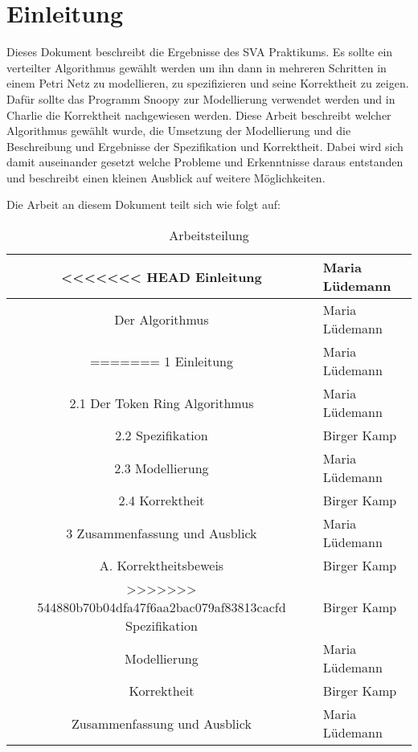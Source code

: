 \newpage
\section{Einleitung} 
Dieses Dokument beschreibt die Ergebnisse des SVA Praktikums. Es sollte ein verteilter Algorithmus gewählt werden um ihn dann in mehreren Schritten in einem Petri Netz zu modellieren, zu spezifizieren und seine Korrektheit zu zeigen. Dafür sollte das Programm Snoopy zur Modellierung verwendet werden und in Charlie die Korrektheit nachgewiesen werden. Diese Arbeit beschreibt welcher Algorithmus gewählt wurde, die Umsetzung der Modellierung und die Beschreibung und Ergebnisse der Spezifikation und Korrektheit.
Dabei wird sich damit auseinander gesetzt welche Probleme und Erkenntnisse daraus entstanden und beschreibt einen kleinen Ausblick auf weitere Möglichkeiten.

Die Arbeit an diesem Dokument teilt sich wie folgt auf:

\begin{table}[H]
\centering
 \begin{tabular}{|c|l|}
 \hline
<<<<<<< HEAD
 	Einleitung & Maria Lüdemann\\
 \hline
	Der Algorithmus & Maria Lüdemann\\
=======
 	1 Einleitung & Maria Lüdemann\\
 \hline
	2.1 Der Token Ring Algorithmus & Maria Lüdemann\\
 \hline
	2.2 Spezifikation & Birger Kamp\\
 \hline
	2.3 Modellierung & Maria Lüdemann\\
 \hline
	2.4 Korrektheit & Birger Kamp\\
 \hline
	3 Zusammenfassung und Ausblick & Maria Lüdemann\\
 \hline
	A. Korrektheitsbeweis & Birger Kamp\\
>>>>>>> 544880b70b04dfa47f6aa2bac079af83813cacfd
 \hline	
	Spezifikation & Birger Kamp\\
 \hline	
 	Modellierung & Maria Lüdemann\\
 \hline
 	Korrektheit & Birger Kamp\\
 \hline	
 	Zusammenfassung und Ausblick & Maria Lüdemann\\
 \hline		 
 
 \end{tabular}
\caption{Arbeitsteilung}
\end{table}